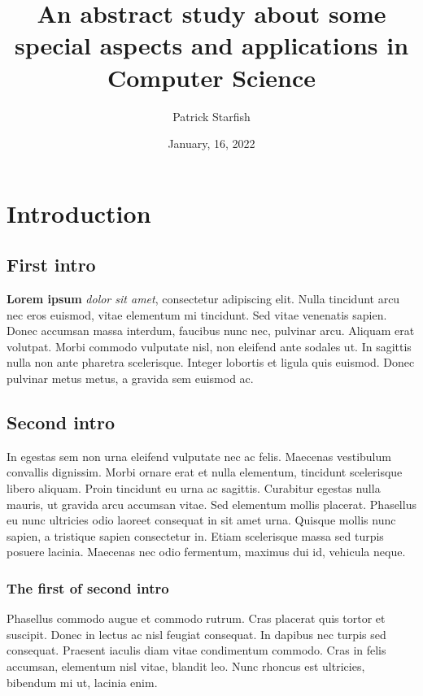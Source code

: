 \documentclass[a4paper, 12pt]{article}
\title{An abstract study about some special aspects and applications in Computer Science}
\author{Patrick Starfish}
\date{January, 16, 2022}
\begin{document}
	\maketitle
	\tableofcontents\newpage
	\section{Introduction}
	\subsection{First intro}
	\textbf{Lorem ipsum} \textit{dolor sit amet}, consectetur adipiscing elit. Nulla tincidunt arcu nec eros euismod, vitae elementum mi tincidunt. Sed vitae venenatis sapien. Donec accumsan massa interdum, faucibus nunc nec, pulvinar arcu. Aliquam erat volutpat. Morbi commodo vulputate nisl, non eleifend ante sodales ut. In sagittis nulla non ante pharetra scelerisque. Integer lobortis et ligula quis euismod. Donec pulvinar metus metus, a gravida sem euismod ac.
	
	\subsection{Second intro}
	\begin{center}
		In egestas sem non urna eleifend vulputate nec ac felis. Maecenas vestibulum convallis dignissim. Morbi ornare erat et nulla elementum, tincidunt scelerisque libero aliquam. Proin tincidunt eu urna ac sagittis. Curabitur egestas nulla mauris, ut gravida arcu accumsan vitae. Sed elementum mollis placerat. Phasellus eu nunc ultricies odio laoreet consequat in sit amet urna. Quisque mollis nunc sapien, a tristique sapien consectetur in. Etiam scelerisque massa sed turpis posuere lacinia. Maecenas nec odio fermentum, maximus dui id, vehicula neque.
	\end{center}
	
	\subsubsection{The first of second intro}
	\begin{flushright}
		Phasellus commodo augue et commodo rutrum. Cras placerat quis tortor et suscipit. Donec in lectus ac nisl feugiat consequat. In dapibus nec turpis sed consequat. Praesent iaculis diam vitae condimentum commodo. Cras in felis accumsan, elementum nisl vitae, blandit leo. Nunc rhoncus est ultricies, bibendum mi ut, lacinia enim.
	\end{flushright}
	
\end{document}
